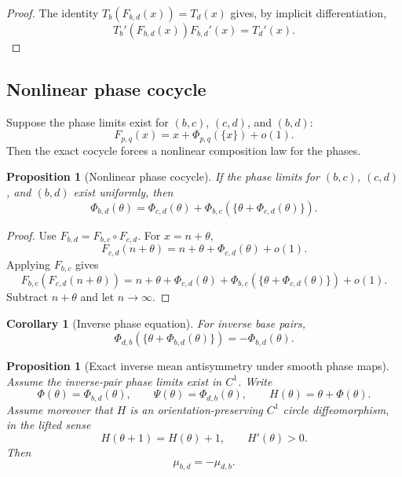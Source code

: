 \documentclass[11pt,a4paper]{article}
\theoremstyle{plain}
\newtheorem{proposition}[theorem]{Proposition}
\newtheorem{corollary}[theorem]{Corollary}
\theoremstyle{definition}
\theoremstyle{remark}
\begin{document}
\begin{proof}
The identity $T_b(F_{b,d}(x))=T_d(x)$ gives, by implicit differentiation,
\[
  T_b'(F_{b,d}(x))F_{b,d}'(x)=T_d'(x).
\]
\end{proof}

\subsection{Nonlinear phase cocycle}

Suppose the phase limits exist for $(b,c)$, $(c,d)$, and $(b,d)$:
\begin{equation}\label{eq:phase-limit-assumption}
  F_{p,q}(x)=x+\Phi_{p,q}(\{x\})+o(1).
\end{equation}
Then the exact cocycle forces a nonlinear composition law for the phases.

\begin{proposition}[Nonlinear phase cocycle]\label{prop:phase-cocycle}
If the phase limits for $(b,c)$, $(c,d)$, and $(b,d)$ exist uniformly, then
\begin{equation}\label{eq:phase-cocycle}
  \Phi_{b,d}(\theta)=\Phi_{c,d}(\theta)+\Phi_{b,c}(\{\theta+\Phi_{c,d}(\theta)\}).
\end{equation}
\end{proposition}

\begin{proof}
Use $F_{b,d}=F_{b,c}\circ F_{c,d}$.  For $x=n+\theta$,
\[
  F_{c,d}(n+\theta)=n+\theta+\Phi_{c,d}(\theta)+o(1).
\]
Applying $F_{b,c}$ gives
\[
  F_{b,c}(F_{c,d}(n+\theta))
  =n+\theta+\Phi_{c,d}(\theta)
  +\Phi_{b,c}(\{\theta+\Phi_{c,d}(\theta)\})+o(1).
\]
Subtract $n+\theta$ and let $n\to\infty$.
\end{proof}

\begin{corollary}[Inverse phase equation]\label{cor:inverse-phase}
For inverse base pairs,
\begin{equation}\label{eq:inverse-phase}
  \Phi_{d,b}(\{\theta+\Phi_{b,d}(\theta)\})=-\Phi_{b,d}(\theta).
\end{equation}
\end{corollary}

\begin{proposition}[Exact inverse mean antisymmetry under smooth phase maps]\label{prop:exact-antisymmetry}
Assume the inverse-pair phase limits exist in $C^1$.  Write
\[
  \Phi(\theta)=\Phi_{b,d}(\theta),\qquad
  \Psi(\theta)=\Phi_{d,b}(\theta),\qquad
  H(\theta)=\theta+\Phi(\theta).
\]
Assume moreover that $H$ is an orientation-preserving $C^1$ circle diffeomorphism, in the lifted sense
\[
  H(\theta+1)=H(\theta)+1,
  \qquad H'(\theta)>0.
\]
Then
\begin{equation}\label{eq:exact-antisymmetry}
  \mu_{b,d}=-\mu_{d,b}.
\end{equation}
\end{proposition}
\end{document}
